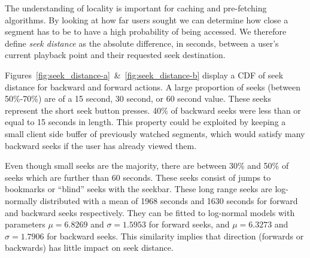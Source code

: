 \documentclass[a4paper,11pt]{article}
\begin{document}
The understanding of locality is important for caching and pre-fetching algorithms. By looking at how far users sought we can determine how close a segment has to be to have a high probability of being accessed. We therefore define \emph{seek distance} as the absolute difference, in seconds, between a user's current playback point and their requested seek destination.

Figures~\ref{fig:seek_distance-a}~\&~\ref{fig:seek_distance-b} display a CDF of seek distance for backward and forward actions. A large proportion of seeks (between 50\%-70\%) are of a 15 second, 30 second, or 60 second value. These seeks represent the short seek button presses.
40\% of backward seeks were less than or equal to 15 seconds in length. This property could be exploited by keeping a small client side buffer of previously watched segments, which would satisfy many backward seeks if the user has already viewed them.





Even though small seeks are the majority, there are between 30\% and 50\% of seeks which are further than 60 seconds. These seeks consist of jumps to bookmarks or ``blind'' seeks with the seekbar. These long range seeks are log-normally distributed with a mean of 1968 seconds and 1630 seconds for forward and backward seeks respectively. They can be fitted to log-normal models with parameters $\mu = 6.8269$ and $\sigma = 1.5953$ for forward seeks, and $\mu = 6.3273$ and $\sigma = 1.7906$ for backward seeks. This similarity implies that direction (forwards or backwards) has little impact on seek distance.
\end{document}
